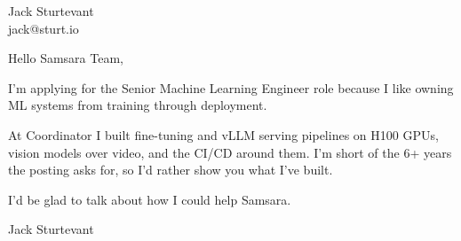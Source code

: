 \documentclass[11pt]{article}
\begin{document}
\raggedright

{\namefont\fontsize{20pt}{24pt}\selectfont Jack Sturtevant}\\[-0.3em]
jack@sturt.io

\vspace{1.2em}

Hello Samsara Team,

I'm applying for the Senior Machine Learning Engineer role because I like owning ML systems from training through deployment.

At Coordinator I built fine-tuning and vLLM serving pipelines on H100 GPUs, vision models over video, and the CI/CD around them. I'm short of the 6+ years the posting asks for, so I'd rather show you what I've built.

I'd be glad to talk about how I could help Samsara.

\vspace{0.6em}
Jack Sturtevant
\end{document}
